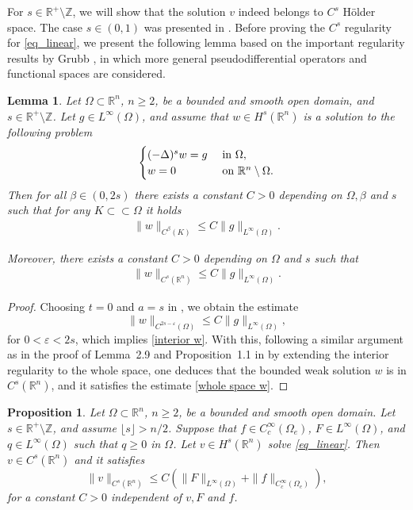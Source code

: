 \documentclass [oneside,11pt] {amsart}
\newcommand{\floor}[1]{\lfloor #1 \rfloor}
\numberwithin{equation}{section}
\newtheorem{prop}{Proposition}[section]
\newtheorem{lemma}{Lemma}[section]
\newcommand{\R}{\mathbb{R}}
\newcommand{\LC}{\left(}
\newcommand{\RC}{\right)}
\begin{document}
For $s\in \R^+\setminus \mathbb{Z}$, we will show that the solution $v$ indeed belongs to  $C^{s}$ H\"older space. The case $s\in (0,1)$ was presented in \cite{lai_global_2018}. 
Before proving the $C^s$ regularity for \eqref{eq_linear}, we present the following lemma based on the important regularity results by Grubb \cite{Grubb}, in which more general pseudodifferential operators and functional spaces are considered.
\begin{lemma}\label{lemma_Cs_estimate}
Let $\Omega \subset\R^n$, $n\ge 2$, be a bounded and smooth open domain, and $s\in \R^+\setminus \mathbb{Z}$. Let $g\in L^\infty(\Omega)$, and assume that $w\in H^{s} (\R^n)$ is a solution to the following problem
\[
\begin{cases}
(-\Delta)^s w = g &\hbox{ in } \Omega, \\
w = 0 &\hbox{ on } \R^n\setminus\Omega.
\end{cases}
\]
Then for all $\beta\in (0,2s)$ there exists a constant $C>0$ depending on $\Omega, \beta$ and $s$ such that for any $K\subset\subset \Omega$ it holds
\begin{align}\label{interior w}
\|w\|_{C^\beta(K)} \le C\|g\|_{L^\infty(\Omega)}.
\end{align}

Moreover, there exists a constant $C>0$ depending on $\Omega$ and $s$ such that 
\begin{align}\label{whole space w}
\|w\|_{C^s(\R^n)} \le C\|g\|_{L^\infty(\Omega)}.
\end{align}
\end{lemma}
\begin{proof}
Choosing $t=0$ and $a=s$ in \cite[Theorem~4]{Grubb}, we obtain the estimate
$$
\|w\|_{C^{2s-\varepsilon}(\Omega)}
\leq C\|g\|_{L^\infty(\Omega)},
$$
for $0<\varepsilon<2s$, which implies \eqref{interior w}. With this, following a similar argument as in the proof of Lemma~2.9 and Proposition~1.1 in \cite{ros-oton_dirichlet_2014} by extending the interior regularity to the whole space, one deduces that the bounded weak solution $w$ is in $C^s(\R^n)$, and it satisfies the estimate \eqref{whole space w}.
\end{proof}


\begin{prop}\label{prop_Holder_linear}
Let $\Omega\subset\R^n$, $n\geq 2$, be a bounded and smooth open domain. Let $s\in \R^+\setminus \mathbb{Z}$, and assume $\floor{s}>n/2$. Suppose that $f\in C_c^\infty(\Omega_e)$, $F\in L^\infty(\Omega)$, and  
$q\in L^\infty(\Omega)$ such that $q\ge 0$ in $\Omega$.
Let $v\in H^s(\R^n)$ solve \eqref{eq_linear}.
Then $v\in C^{s}(\R^n)$ and it satisfies
\[
\|v\|_{C^{s}(\R^n)}
\le
C \LC  \|F\|_{L^\infty(\Omega)}+ \|f\|_{C_c^\infty(\Omega_e)} \RC,
\]
for a constant $C>0$ independent of $v, F$ and $f$. 
\end{prop}
\end{document}
